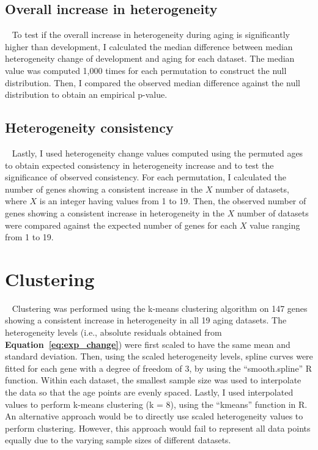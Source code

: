 \subsection{Overall increase in heterogeneity}~\label{subsec:perm.overall}
To test if the overall increase in heterogeneity during aging is significantly higher than development, 
I calculated the median difference between median heterogeneity change of development and aging for each dataset.
The median value was computed 1,000 times for each permutation to construct the null distribution.
Then, I compared the observed median difference against the null distribution to obtain an empirical p-value.

\subsection{Heterogeneity consistency}~\label{subsec:perm.consist}
Lastly, I used heterogeneity change values computed using the permuted ages to obtain expected consistency in heterogeneity increase and to test the significance of observed consistency.
For each permutation, I calculated the number of genes showing a consistent increase in the $X$ number of datasets, where $X$ is an integer having values from 1 to 19.
Then, the observed number of genes showing a consistent increase in heterogeneity in the $X$ number of datasets were compared against the expected number of genes for
each $X$ value ranging from 1 to 19.

\section{Clustering}~\label{sec:cluster}
Clustering was performed using the k-means clustering algorithm on 147 genes showing a consistent increase in heterogeneity in all 19 aging datasets.
The heterogeneity levels (i.e., absolute residuals obtained from \textbf{Equation~\ref{eq:exp_change}}) were first scaled to have the same mean and standard deviation. 
Then, using the scaled heterogeneity levels, spline curves were fitted for each gene with a degree of freedom of 3, by using the ``smooth.spline'' R function.
Within each dataset, the smallest sample size was used to interpolate the data so that the age points are evenly spaced.
Lastly, I used interpolated values to perform k-means clustering (k = 8), using the ``kmeans'' function in R.
An alternative approach would be to directly use scaled heterogeneity values to perform clustering. 
However, this approach would fail to represent all data points equally due to the varying sample sizes of different datasets.


